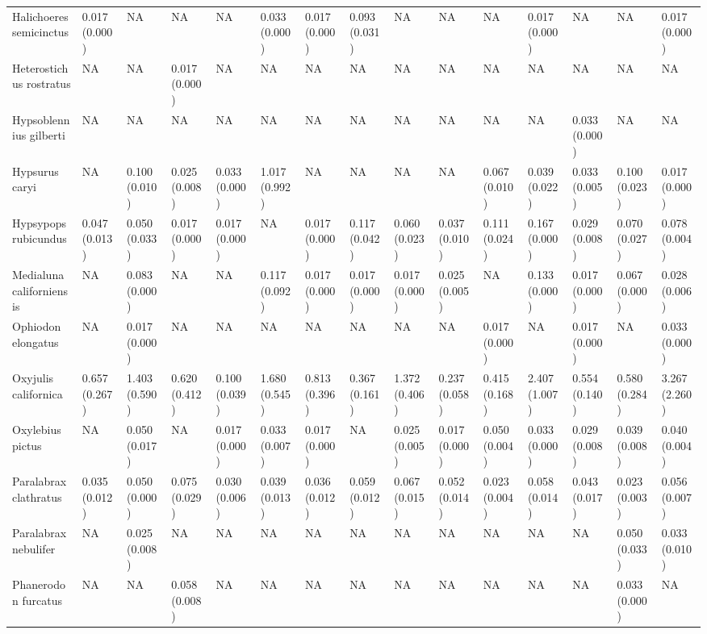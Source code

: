 \documentclass[12pt,]{article}
\begin{document}
\begin{landscape}
\begin{table}
{\begin{tabular}[t]{lllllllllllllll}
\addlinespace
Halichoeres semicinctus & 0.017 (0.000) & NA & NA & NA & 0.033 (0.000) & 0.017 (0.000) & 0.093 (0.031) & NA & NA & NA & 0.017 (0.000) & NA & NA & 0.017 (0.000)\\
Heterostichus rostratus & NA & NA & 0.017 (0.000) & NA & NA & NA & NA & NA & NA & NA & NA & NA & NA & NA\\
Hypsoblennius gilberti & NA & NA & NA & NA & NA & NA & NA & NA & NA & NA & NA & 0.033 (0.000) & NA & NA\\
Hypsurus caryi & NA & 0.100 (0.010) & 0.025 (0.008) & 0.033 (0.000) & 1.017 (0.992) & NA & NA & NA & NA & 0.067 (0.010) & 0.039 (0.022) & 0.033 (0.005) & 0.100 (0.023) & 0.017 (0.000)\\
Hypsypops rubicundus & 0.047 (0.013) & 0.050 (0.033) & 0.017 (0.000) & 0.017 (0.000) & NA & 0.017 (0.000) & 0.117 (0.042) & 0.060 (0.023) & 0.037 (0.010) & 0.111 (0.024) & 0.167 (0.000) & 0.029 (0.008) & 0.070 (0.027) & 0.078 (0.004)\\
\addlinespace
Medialuna californiensis & NA & 0.083 (0.000) & NA & NA & 0.117 (0.092) & 0.017 (0.000) & 0.017 (0.000) & 0.017 (0.000) & 0.025 (0.005) & NA & 0.133 (0.000) & 0.017 (0.000) & 0.067 (0.000) & 0.028 (0.006)\\
Ophiodon elongatus & NA & 0.017 (0.000) & NA & NA & NA & NA & NA & NA & NA & 0.017 (0.000) & NA & 0.017 (0.000) & NA & 0.033 (0.000)\\
Oxyjulis californica & 0.657 (0.267) & 1.403 (0.590) & 0.620 (0.412) & 0.100 (0.039) & 1.680 (0.545) & 0.813 (0.396) & 0.367 (0.161) & 1.372 (0.406) & 0.237 (0.058) & 0.415 (0.168) & 2.407 (1.007) & 0.554 (0.140) & 0.580 (0.284) & 3.267 (2.260)\\
Oxylebius pictus & NA & 0.050 (0.017) & NA & 0.017 (0.000) & 0.033 (0.007) & 0.017 (0.000) & NA & 0.025 (0.005) & 0.017 (0.000) & 0.050 (0.004) & 0.033 (0.000) & 0.029 (0.008) & 0.039 (0.008) & 0.040 (0.004)\\
Paralabrax clathratus & 0.035 (0.012) & 0.050 (0.000) & 0.075 (0.029) & 0.030 (0.006) & 0.039 (0.013) & 0.036 (0.012) & 0.059 (0.012) & 0.067 (0.015) & 0.052 (0.014) & 0.023 (0.004) & 0.058 (0.014) & 0.043 (0.017) & 0.023 (0.003) & 0.056 (0.007)\\
\addlinespace
Paralabrax nebulifer & NA & 0.025 (0.008) & NA & NA & NA & NA & NA & NA & NA & NA & NA & NA & 0.050 (0.033) & 0.033 (0.010)\\
Phanerodon furcatus & NA & NA & 0.058 (0.008) & NA & NA & NA & NA & NA & NA & NA & NA & NA & 0.033 (0.000) & NA\\

\end{tabular}}
\end{table}
\end{landscape}
\end{document}

